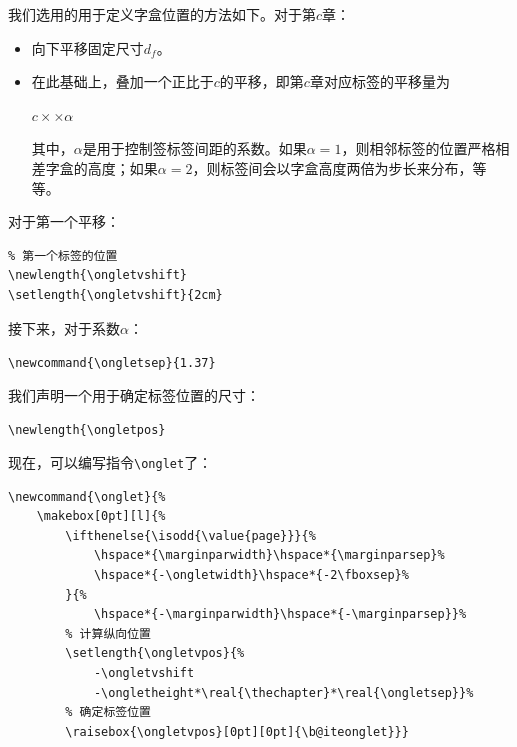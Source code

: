 我们选用的用于定义字盒位置的方法如下。对于第$c$章：

\begin{itemize}
    \item 向下平移固定尺寸$d_f$。
    \item 在此基础上，叠加一个正比于$c$的平移，即第$c$章对应标签的平移量为
    
    \begin{center}
        $c\times$$\times \alpha$
    \end{center}

    其中，$\alpha$是用于控制签标签间距的系数。如果$\alpha=1$，则相邻标签的位置严格相差字盒的高度；如果$\alpha=2$，则标签间会以字盒高度两倍为步长来分布，等等。
\end{itemize}

对于第一个平移：

\begin{dmd}
\begin{verbatim}
% 第一个标签的位置
\newlength{\ongletvshift}
\setlength{\ongletvshift}{2cm}
\end{verbatim}
\end{dmd}

接下来，对于系数$\alpha$：

\begin{dmd}
\verb+\newcommand{\ongletsep}{1.37}+
\end{dmd}

我们声明一个用于确定标签位置的尺寸：

\begin{dmd}
\verb|\newlength{\ongletpos}|
\end{dmd}

现在，可以编写指令\verb|\onglet|了：

\begin{dmd}
\begin{verbatim}
\newcommand{\onglet}{% 
    \makebox[0pt][l]{%
        \ifthenelse{\isodd{\value{page}}}{% 
            \hspace*{\marginparwidth}\hspace*{\marginparsep}% 
            \hspace*{-\ongletwidth}\hspace*{-2\fboxsep}%
        }{% 
            \hspace*{-\marginparwidth}\hspace*{-\marginparsep}}%
        % 计算纵向位置
        \setlength{\ongletvpos}{%
            -\ongletvshift
            -\ongletheight*\real{\thechapter}*\real{\ongletsep}}% 
        % 确定标签位置 
        \raisebox{\ongletvpos}[0pt][0pt]{\b@iteonglet}}}
\end{verbatim}
\end{dmd}

